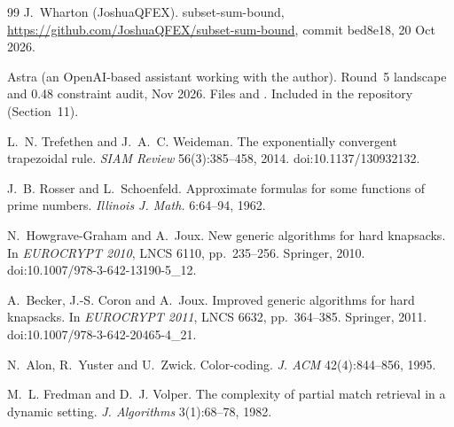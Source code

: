 \documentclass[11pt]{article}
\theoremstyle{plain}
\begin{document}
\begin{thebibliography}{99}
J.~Wharton (JoshuaQFEX). subset-sum-bound, \url{https://github.com/JoshuaQFEX/subset-sum-bound}, commit bed8e18, 20 Oct 2026.

Astra (an OpenAI-based assistant working with the author). Round~5 landscape and 0.48 constraint audit, Nov 2026. Files  and . Included in the repository (Section~11).

L.~N. Trefethen and J.~A.~C. Weideman. The exponentially convergent trapezoidal rule. \emph{SIAM Review} 56(3):385--458, 2014. doi:10.1137/130932132.

J.~B. Rosser and L.~Schoenfeld. Approximate formulas for some functions of prime numbers. \emph{Illinois J. Math.} 6:64--94, 1962.

N.~Howgrave-Graham and A.~Joux. New generic algorithms for hard knapsacks. In \emph{EUROCRYPT 2010}, LNCS 6110, pp.~235--256. Springer, 2010. doi:10.1007/978-3-642-13190-5\_12.

A.~Becker, J.-S. Coron and A.~Joux. Improved generic algorithms for hard knapsacks. In \emph{EUROCRYPT 2011}, LNCS 6632, pp.~364--385. Springer, 2011. doi:10.1007/978-3-642-20465-4\_21.

N.~Alon, R.~Yuster and U.~Zwick. Color-coding. \emph{J. ACM} 42(4):844--856, 1995.

M.~L. Fredman and D.~J. Volper. The complexity of partial match retrieval in a dynamic setting. \emph{J. Algorithms} 3(1):68--78, 1982.

\end{thebibliography}
\end{document}
